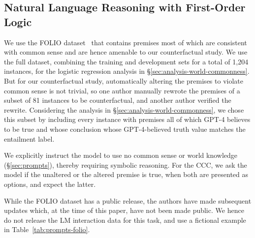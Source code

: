 \subsection{Natural Language Reasoning with First-Order Logic} \label{sec:setup-folio}

We use the FOLIO dataset~\citep{han2022folio} that contains premises most of which are consistent with common sense and are hence amenable to our counterfactual study. We use the full dataset, combining the training and development sets for a total of 1,204 instances, for the logistic regression analysis in \S\ref{sec:analysis-world-commonness}. But for our counterfactual study, automatically altering the premises to violate common sense is not trivial, so one author manually rewrote the premises of a subset of 81 instances to be counterfactual, and another author verified the rewrite. Considering the analysis in \S\ref{sec:analysis-world-commonness}, we chose this subset by including every instance with premises all of which GPT-4 believes to be true and whose conclusion whose GPT-4-believed truth value matches the entailment label.

We explicitly instruct the model to use no common sense or world knowledge (\S\ref{sec:prompts}), thereby requiring symbolic reasoning. For the CCC, we ask the model if the unaltered or the altered premise is true, when both are presented as options, and expect the latter.

While the FOLIO dataset has a public release, the authors have made subsequent updates which, at the time of this paper, have not been made public. We hence do not release the LM interaction data for this task, and use a fictional example in Table~\ref{tab:prompts-folio}.
